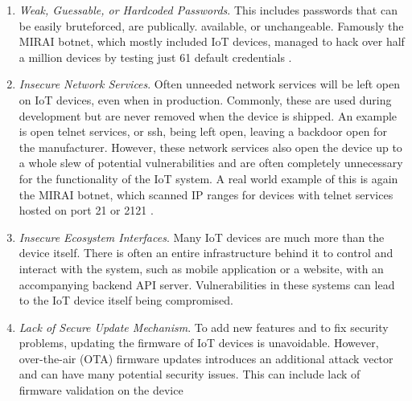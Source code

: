 \begin{enumerate}
    \item \textit{Weak, Guessable, or Hardcoded Passwords}. This includes passwords that can be easily bruteforced, are publically. available, or unchangeable. Famously the MIRAI botnet, which mostly included IoT devices, managed to hack over half a million devices by testing just 61 default credentials \cite{understanding-mirai}.
    
    \item \textit{Insecure Network Services}. Often unneeded network services will be left open on IoT devices, even when in production. Commonly, these are used during development but are never removed when the device is shipped. An example is open telnet services, or ssh, being left open, leaving a backdoor open for the manufacturer. However, these network services also open the device up to a whole slew of potential vulnerabilities and are often completely unnecessary for the functionality of the IoT system. A real world example of this is again the MIRAI botnet, which scanned IP ranges for devices with telnet services hosted on port 21 or 2121 \citeauthor{understanding-mirai}.
    
    \item \textit{Insecure Ecosystem Interfaces}. Many IoT devices are much more than the device itself. There is often an entire infrastructure behind it to control and interact with the system, such as mobile application or a website, with an accompanying backend API server. Vulnerabilities in these systems can lead to the IoT device itself being compromised.
    
    \item \textit{Lack of Secure Update Mechanism}. To add new features and to fix security problems, updating the firmware of IoT devices is unavoidable. However, over-the-air (OTA) firmware updates introduces an additional attack vector and can have many potential security issues. This can include lack of firmware validation on the device 
    

\end{enumerate}
